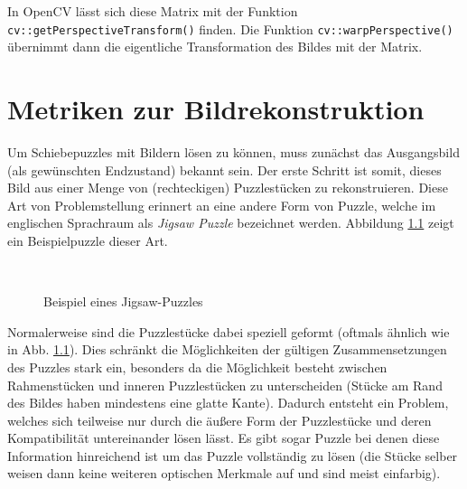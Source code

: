 \documentclass{whswinvcbook}
\begin{document}
In OpenCV lässt sich diese Matrix mit der Funktion \texttt{cv::getPerspectiveTransform()} finden. Die Funktion \texttt{cv::warpPerspective()} übernimmt dann die eigentliche Transformation des Bildes mit der Matrix.
\chapter{Metriken zur Bildrekonstruktion}\label{ch-metrics}
Um Schiebepuzzles mit Bildern lösen zu können, muss zunächst das Ausgangsbild (als gewünschten Endzustand) bekannt sein. Der erste Schritt ist somit, dieses Bild aus einer Menge von (rechteckigen) Puzzlestücken zu rekonstruieren. Diese Art von Problemstellung erinnert an eine andere Form von Puzzle, welche im englischen Sprachraum als \textit{Jigsaw Puzzle} bezeichnet werden. Abbildung \ref{fig-jig-ex} zeigt ein Beispielpuzzle dieser Art.
\begin{figure}[H]
    \centering
    \\
    \quad
    \caption{Beispiel eines Jigsaw-Puzzles}
    \label{fig-jig-ex}
\end{figure}
Normalerweise sind die Puzzlestücke dabei speziell geformt (oftmals ähnlich wie in Abb. \ref{fig-jig-ex}). Dies schränkt die Möglichkeiten der gültigen Zusammensetzungen des Puzzles stark ein, besonders da die Möglichkeit besteht zwischen Rahmenstücken und inneren Puzzlestücken zu unterscheiden (Stücke am Rand des Bildes haben mindestens eine glatte Kante). Dadurch entsteht ein Problem, welches sich teilweise nur durch die äußere Form der Puzzlestücke und deren Kompatibilität untereinander lösen lässt. Es gibt sogar Puzzle bei denen diese Information hinreichend ist um das Puzzle vollständig zu lösen (die Stücke selber weisen dann keine weiteren optischen Merkmale auf und sind meist einfarbig).
\end{document}
